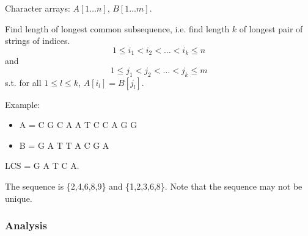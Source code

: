 \AlgoInput Character arrays: $A[1\ldots n]$, $B[1\ldots m]$.

\AlgoOutput Find length of longest common subsequence, i.e.
find length $k$ of longest pair of strings of indices.
\[1\leq i_1 < i_2 < \ldots < i_k \leq n\]
and
\[1 \leq j_1 < j_2 < \ldots < j_k \leq m\]
s.t. for all $1 \leq l \leq k$, $A[i_l] = B[j_l]$.

Example:
\begin{itemize}
    \item A = C G C A A T C C A G G
    \item B = G A T T A C G A
\end{itemize}

LCS = G A T C A. 

The sequence is \{2,4,6,8,9\} and \{1,2,3,6,8\}. Note that the sequence may not be unique.

\subsubsection{Analysis}

